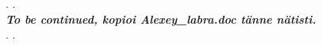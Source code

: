 \documentclass[fleqn,10pt]{SelfArx} %
\begin{document}
%
%
%
%



.
\vspace{10mm}
.\\
\textbf{
\emph{To be continued, kopioi Alexey\_labra.doc tänne nätisti.
}}\\
.
\vspace{10mm}
.
\end{document}
